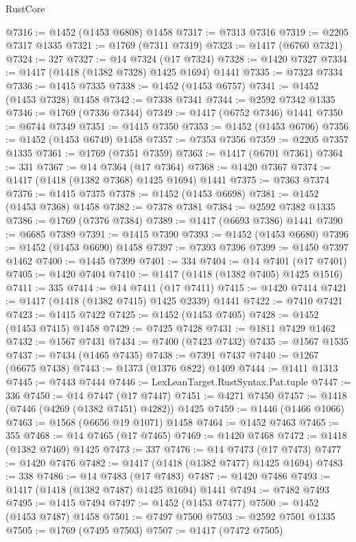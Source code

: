 \begin{lexlean}{RustCore}
\begin{coremodule}
@7316 := @1452 (@1453 @6808) @1458
@7317 := @7313 @7316
@7319 := @2205 @7317 @1335
@7321 := @1769 (@7311 @7319)
@7323 := @1417 (@6760 @7321)
@7324 := 327
@7327 := @14 @7324 (@17 @7324)
@7328 := @1420 @7327
@7334 := @1417 (@1418 (@1382 @7328) @1425 @1694) @1441
@7335 := @7323 @7334
@7336 := @1415 @7335
@7338 := @1452 (@1453 @6757)
@7341 := @1452 (@1453 @7328) @1458
@7342 := @7338 @7341
@7344 := @2592 @7342 @1335
@7346 := @1769 (@7336 @7344)
@7349 := @1417 (@6752 @7346) @1441
@7350 := @6744 @7349
@7351 := @1415 @7350
@7353 := @1452 (@1453 @6706)
@7356 := @1452 (@1453 @6749) @1458
@7357 := @7353 @7356
@7359 := @2205 @7357 @1335
@7361 := @1769 (@7351 @7359)
@7363 := @1417 (@6701 @7361)
@7364 := 331
@7367 := @14 @7364 (@17 @7364)
@7368 := @1420 @7367
@7374 := @1417 (@1418 (@1382 @7368) @1425 @1694) @1441
@7375 := @7363 @7374
@7376 := @1415 @7375
@7378 := @1452 (@1453 @6698)
@7381 := @1452 (@1453 @7368) @1458
@7382 := @7378 @7381
@7384 := @2592 @7382 @1335
@7386 := @1769 (@7376 @7384)
@7389 := @1417 (@6693 @7386) @1441
@7390 := @6685 @7389
@7391 := @1415 @7390
@7393 := @1452 (@1453 @6680)
@7396 := @1452 (@1453 @6690) @1458
@7397 := @7393 @7396
@7399 := @1450 @7397 @1462
@7400 := @1445 @7399
@7401 := 334
@7404 := @14 @7401 (@17 @7401)
@7405 := @1420 @7404
@7410 := @1417 (@1418 (@1382 @7405) @1425 @1516)
@7411 := 335
@7414 := @14 @7411 (@17 @7411)
@7415 := @1420 @7414
@7421 := @1417 (@1418 (@1382 @7415) @1425 @2339) @1441
@7422 := @7410 @7421
@7423 := @1415 @7422
@7425 := @1452 (@1453 @7405)
@7428 := @1452 (@1453 @7415) @1458
@7429 := @7425 @7428
@7431 := @1811 @7429 @1462
@7432 := @1567 @7431
@7434 := @7400 (@7423 @7432)
@7435 := @1567 @1535
@7437 := @7434 (@1465 @7435)
@7438 := @7391 @7437
@7440 := @1267 (@6675 @7438)
@7443 := @1373 (@1376 @822) @1409
@7444 := @1411 @1313
@7445 := @7443 @7444
@7446 := LexLeanTarget.RustSyntax.Pat.tuple
@7447 := 336
@7450 := @14 @7447 (@17 @7447)
@7451 := @4271 @7450
@7457 := @1418 (@7446 (@4269 (@1382 @7451) @4282)) @1425
@7459 := @1446 (@1466 @1066)
@7463 := @1568 (@6656 @19 @1071) @1458
@7464 := @1452 @7463
@7465 := 355
@7468 := @14 @7465 (@17 @7465)
@7469 := @1420 @7468
@7472 := @1418 (@1382 @7469) @1425
@7473 := 337
@7476 := @14 @7473 (@17 @7473)
@7477 := @1420 @7476
@7482 := @1417 (@1418 (@1382 @7477) @1425 @1694)
@7483 := 338
@7486 := @14 @7483 (@17 @7483)
@7487 := @1420 @7486
@7493 := @1417 (@1418 (@1382 @7487) @1425 @1694) @1441
@7494 := @7482 @7493
@7495 := @1415 @7494
@7497 := @1452 (@1453 @7477)
@7500 := @1452 (@1453 @7487) @1458
@7501 := @7497 @7500
@7503 := @2592 @7501 @1335
@7505 := @1769 (@7495 @7503)
@7507 := @1417 (@7472 @7505)

\end{coremodule}
\end{lexlean}
